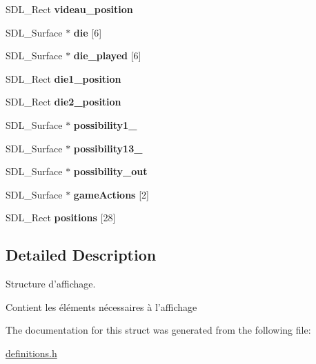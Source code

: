 \begin{DoxyCompactItemize}
\item 
\hypertarget{structSDisplay_a059b716c6d540e51ec363bb741fd8a53}{
SDL\_\-Rect {\bfseries videau\_\-position}}
\label{structSDisplay_a059b716c6d540e51ec363bb741fd8a53}

\item 
\hypertarget{structSDisplay_aea5bc5ff1ed648c810d00e1d48d8e619}{
SDL\_\-Surface $\ast$ {\bfseries die} \mbox{[}6\mbox{]}}
\label{structSDisplay_aea5bc5ff1ed648c810d00e1d48d8e619}

\item 
\hypertarget{structSDisplay_a51ed2df85e3027713064e3d935f79904}{
SDL\_\-Surface $\ast$ {\bfseries die\_\-played} \mbox{[}6\mbox{]}}
\label{structSDisplay_a51ed2df85e3027713064e3d935f79904}

\item 
\hypertarget{structSDisplay_a80bf0e3221aea33f72156b197abd9b51}{
SDL\_\-Rect {\bfseries die1\_\-position}}
\label{structSDisplay_a80bf0e3221aea33f72156b197abd9b51}

\item 
\hypertarget{structSDisplay_aae571922628b1ea21398e1ba7ce4f1ba}{
SDL\_\-Rect {\bfseries die2\_\-position}}
\label{structSDisplay_aae571922628b1ea21398e1ba7ce4f1ba}

\item 
\hypertarget{structSDisplay_ac491a5f88369028b4228737a1b951dcb}{
SDL\_\-Surface $\ast$ {\bfseries possibility1\_}}
\label{structSDisplay_ac491a5f88369028b4228737a1b951dcb}

\item 
\hypertarget{structSDisplay_a6de9489701d5768bb7ec8ab222643e9b}{
SDL\_\-Surface $\ast$ {\bfseries possibility13\_}}
\label{structSDisplay_a6de9489701d5768bb7ec8ab222643e9b}

\item 
\hypertarget{structSDisplay_aeb907fac8ea639eb4afe4a3369628b91}{
SDL\_\-Surface $\ast$ {\bfseries possibility\_\-out}}
\label{structSDisplay_aeb907fac8ea639eb4afe4a3369628b91}

\item 
\hypertarget{structSDisplay_af9b81eeb8d361bb8017e60c81d959afc}{
SDL\_\-Surface $\ast$ {\bfseries gameActions} \mbox{[}2\mbox{]}}
\label{structSDisplay_af9b81eeb8d361bb8017e60c81d959afc}

\item 
\hypertarget{structSDisplay_a2c5b958879efac6cbdc92e8d16d7e832}{
SDL\_\-Rect {\bfseries positions} \mbox{[}28\mbox{]}}
\label{structSDisplay_a2c5b958879efac6cbdc92e8d16d7e832}

\end{DoxyCompactItemize}


\subsection{Detailed Description}
Structure d'affichage. 

Contient les éléments nécessaires à l'affichage 

The documentation for this struct was generated from the following file:\begin{DoxyCompactItemize}
\item 
\hyperlink{definitions_8h}{definitions.h}\end{DoxyCompactItemize}
